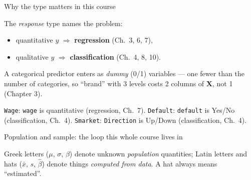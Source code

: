 \documentclass[aspectratio=169,11pt]{beamer}
\begin{document}
\begin{frame}{Why the type matters in this course}
  \begin{takeaway}
    The \emph{response} type names the problem:
    \begin{itemize}
      \item quantitative $y$ $\Rightarrow$ \textbf{regression} (Ch.\ 3, 6, 7),
      \item qualitative $y$ $\Rightarrow$ \textbf{classification} (Ch.\ 4, 8, 10).
    \end{itemize}
  \end{takeaway}
  \begin{readme}
    A categorical predictor enters as \emph{dummy} (0/1) variables --- one
    fewer than the number of categories, so ``brand'' with 3 levels costs 2
    columns of $\mathbf{X}$, not 1 (Chapter 3).
  \end{readme}
  \begin{numexample}
    \texttt{Wage}: \texttt{wage} is quantitative (regression, Ch.\ 7).
    \texttt{Default}: \texttt{default} is Yes/No (classification, Ch.\ 4).
    \texttt{Smarket}: \texttt{Direction} is Up/Down (classification, Ch.\ 4).
  \end{numexample}
\end{frame}

\begin{frame}{Population and sample: the loop this whole course lives in}
  \begin{center}
  \end{center}
  \begin{takeaway}
    Greek letters ($\mu$, $\sigma$, $\beta$) denote unknown \emph{population}
    quantities; Latin letters and hats ($\bar x$, $s$, $\hat\beta$) denote
    things \emph{computed from data}. A hat always means ``estimated''.
  \end{takeaway}
\end{frame}
\end{document}
